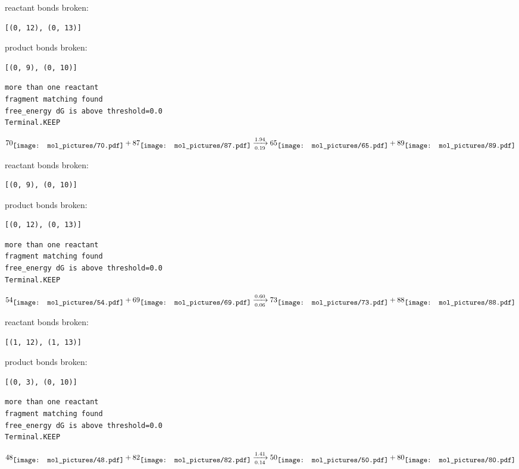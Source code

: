 \documentclass{article}
\begin{document}
reactant bonds broken:\begin{verbatim}
[(0, 12), (0, 13)]
\end{verbatim}
product bonds broken:\begin{verbatim}
[(0, 9), (0, 10)]
\end{verbatim}




\vspace{1cm}
\begin{verbatim}
more than one reactant
fragment matching found
free_energy dG is above threshold=0.0
Terminal.KEEP
\end{verbatim}
$$
70
\raisebox{-.5\height}{\texttt{[image: mol\_pictures/70.pdf]}}
+
87
\raisebox{-.5\height}{\texttt{[image: mol\_pictures/87.pdf]}}
\xrightarrow[0.19]{1.94}
65
\raisebox{-.5\height}{\texttt{[image: mol\_pictures/65.pdf]}}
+
89
\raisebox{-.5\height}{\texttt{[image: mol\_pictures/89.pdf]}}
$$


reactant bonds broken:\begin{verbatim}
[(0, 9), (0, 10)]
\end{verbatim}
product bonds broken:\begin{verbatim}
[(0, 12), (0, 13)]
\end{verbatim}




\vspace{1cm}
\begin{verbatim}
more than one reactant
fragment matching found
free_energy dG is above threshold=0.0
Terminal.KEEP
\end{verbatim}
$$
54
\raisebox{-.5\height}{\texttt{[image: mol\_pictures/54.pdf]}}
+
69
\raisebox{-.5\height}{\texttt{[image: mol\_pictures/69.pdf]}}
\xrightarrow[0.06]{0.60}
73
\raisebox{-.5\height}{\texttt{[image: mol\_pictures/73.pdf]}}
+
88
\raisebox{-.5\height}{\texttt{[image: mol\_pictures/88.pdf]}}
$$


reactant bonds broken:\begin{verbatim}
[(1, 12), (1, 13)]
\end{verbatim}
product bonds broken:\begin{verbatim}
[(0, 3), (0, 10)]
\end{verbatim}




\vspace{1cm}
\begin{verbatim}
more than one reactant
fragment matching found
free_energy dG is above threshold=0.0
Terminal.KEEP
\end{verbatim}
$$
48
\raisebox{-.5\height}{\texttt{[image: mol\_pictures/48.pdf]}}
+
82
\raisebox{-.5\height}{\texttt{[image: mol\_pictures/82.pdf]}}
\xrightarrow[0.14]{1.41}
50
\raisebox{-.5\height}{\texttt{[image: mol\_pictures/50.pdf]}}
+
80
\raisebox{-.5\height}{\texttt{[image: mol\_pictures/80.pdf]}}
$$
\end{document}
